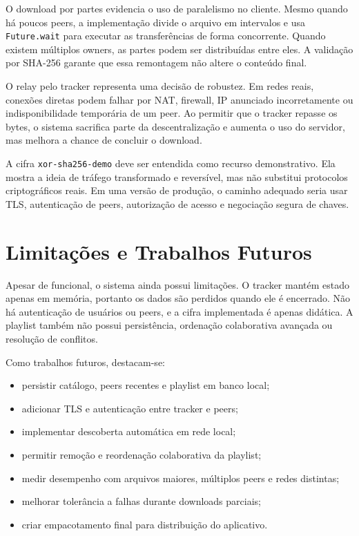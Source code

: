 \documentclass[
	12pt,
	oneside,
	a4paper,
	chapter=TITLE,
	section=TITLE,
	english,
	brazilian,
	sumario=tradicional
]{abntex2}
\begin{document}
O download por partes evidencia o uso de paralelismo no cliente. Mesmo quando há poucos peers, a implementação divide o arquivo em intervalos e usa \texttt{Future.wait} para executar as transferências de forma concorrente. Quando existem múltiplos owners, as partes podem ser distribuídas entre eles. A validação por SHA-256 garante que essa remontagem não altere o conteúdo final.

O relay pelo tracker representa uma decisão de robustez. Em redes reais, conexões diretas podem falhar por NAT, firewall, IP anunciado incorretamente ou indisponibilidade temporária de um peer. Ao permitir que o tracker repasse os bytes, o sistema sacrifica parte da descentralização e aumenta o uso do servidor, mas melhora a chance de concluir o download.

A cifra \texttt{xor-sha256-demo} deve ser entendida como recurso demonstrativo. Ela mostra a ideia de tráfego transformado e reversível, mas não substitui protocolos criptográficos reais. Em uma versão de produção, o caminho adequado seria usar TLS, autenticação de peers, autorização de acesso e negociação segura de chaves.

\section{Limitações e Trabalhos Futuros}

Apesar de funcional, o sistema ainda possui limitações. O tracker mantém estado apenas em memória, portanto os dados são perdidos quando ele é encerrado. Não há autenticação de usuários ou peers, e a cifra implementada é apenas didática. A playlist também não possui persistência, ordenação colaborativa avançada ou resolução de conflitos.

Como trabalhos futuros, destacam-se:

\begin{itemize}
	\item persistir catálogo, peers recentes e playlist em banco local;
	\item adicionar TLS e autenticação entre tracker e peers;
	\item implementar descoberta automática em rede local;
	\item permitir remoção e reordenação colaborativa da playlist;
	\item medir desempenho com arquivos maiores, múltiplos peers e redes distintas;
	\item melhorar tolerância a falhas durante downloads parciais;
	\item criar empacotamento final para distribuição do aplicativo.
\end{itemize}
\end{document}
